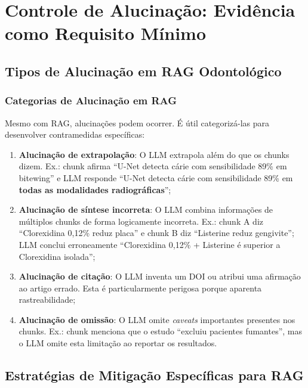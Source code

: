 \section{Controle de Alucinação: Evidência como Requisito Mínimo}

\subsection{Tipos de Alucinação em RAG Odontológico}

\subsubsection{Categorias de Alucinação em RAG}

Mesmo com RAG, alucinações podem ocorrer. É útil categorizá-las para desenvolver contramedidas específicas:

\begin{enumerate}
    \item \textbf{Alucinação de extrapolação}: O LLM extrapola além do que os chunks dizem. Ex.: chunk afirma ``U-Net detecta cárie com sensibilidade 89\% em bitewing'' e LLM responde ``U-Net detecta cárie com sensibilidade 89\% em \textbf{todas as modalidades radiográficas}'';

    \item \textbf{Alucinação de síntese incorreta}: O LLM combina informações de múltiplos chunks de forma logicamente incorreta. Ex.: chunk A diz ``Clorexidina 0,12\% reduz placa'' e chunk B diz ``Listerine reduz gengivite''; LLM conclui erroneamente ``Clorexidina 0,12\% + Listerine é superior a Clorexidina isolada'';

    \item \textbf{Alucinação de citação}: O LLM inventa um DOI ou atribui uma afirmação ao artigo errado. Esta é particularmente perigosa porque aparenta rastreabilidade;

    \item \textbf{Alucinação de omissão}: O LLM omite \textit{caveats} importantes presentes nos chunks. Ex.: chunk menciona que o estudo ``excluiu pacientes fumantes'', mas o LLM omite esta limitação ao reportar os resultados.
\end{enumerate}

\subsection{Estratégias de Mitigação Específicas para RAG}

